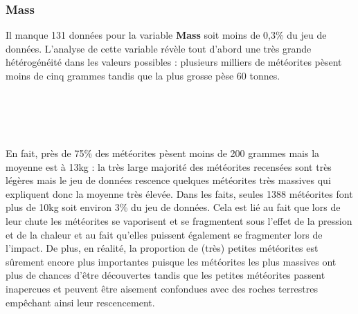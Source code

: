 \documentclass[12pt]{article}
\begin{document}
\subsubsection*{Mass}
Il manque 131 données pour la variable \textbf{Mass} soit moins de 0,3\% du jeu de données. L'analyse de cette variable révèle tout d'abord une très grande hétérogénéité dans les valeurs possibles : plusieurs milliers de météorites pèsent moins de cinq grammes tandis que la plus grosse pèse 60 tonnes.\\
\\
\\
\\
\\
En fait, près de 75\% des météorites pèsent moins de 200 grammes mais la moyenne est à 13kg : la très large majorité des météorites recensées sont très légères mais le jeu de données rescence quelques météorites très massives qui expliquent donc la moyenne très élevée. Dans les faits, seules 1388 météorites font plus de 10kg soit environ 3\% du jeu de données. Cela est lié au fait que lors de leur chute les météorites se vaporisent et se fragmentent sous l'effet de la pression et de la chaleur et au fait qu'elles puissent également se fragmenter lors de l'impact. De plus, en réalité, la proportion de (très) petites météorites est sûrement encore plus importantes puisque les météorites les plus massives ont plus de chances d'être découvertes tandis que les petites météorites passent inapercues et peuvent être aisement confondues avec des roches terrestres empêchant ainsi leur rescencement.
\end{document}
